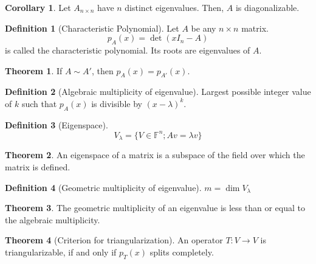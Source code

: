 \documentclass[fleqn, a5paper, 10pt]{amsart}
\theoremstyle{definition}
\newtheorem{definition}{Definition} %
\theoremstyle{theorem}
\newtheorem{theorem}{Theorem} %
\newtheorem{corollary}{Corollary}
\theoremstyle{remark}
\numberwithin{corollary}{theorem}
\numberwithin{equation}{theorem}
\begin{document}
\begin{corollary}
	Let $A_{n \times n}$ have $n$ distinct eigenvalues. Then, $A$ is diagonalizable.
\end{corollary}

\begin{definition}[Characteristic Polynomial]
	Let $A$ be any $n \times n$ matrix.
	\begin{equation*}
		p_A (x) = \det (x I_n - A)
	\end{equation*}
	is called the characteristic polynomial. Its roots are eigenvalues of $A$.
\end{definition}

\begin{theorem}
	If $A \sim A'$, then $p_A (x) = p_{A'} (x)$.
\end{theorem}

\begin{definition}[Algebraic multiplicity of eigenvalue]\label{algebraic multiplicity}
	Largest possible integer value of $k$ such that $p_A(x)$ is divisible by $(x - \lambda)^k$.
\end{definition}

\begin{definition}[Eigenspace]
	\begin{equation*}
		V_{\lambda} = \{V \in \mathbb{F}^n ; A v = \lambda v \}
	\end{equation*} 
\end{definition}

\begin{theorem}
	An eigenspace of a matrix is a subspace of the field over which the matrix is defined.
\end{theorem}

\begin{definition}[Geometric multiplicity of eigenvalue]
	$m = \dim V_{\lambda}$
\end{definition}

\begin{theorem}
	The geometric multiplicity of an eigenvalue is less than or equal to the algebraic multiplicity.
\end{theorem}

\begin{theorem}[Criterion for triangularization]
	An operator $T : V \to V$ is triangularizable, if and only if $p_T (x)$ splits completely.
\end{theorem}
\end{document}
